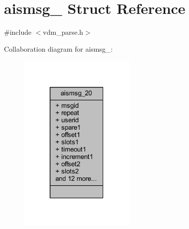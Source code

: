 \hypertarget{structaismsg__20}{}\section{aismsg\+\_ Struct Reference}
\label{structaismsg__20}


{\ttfamily \#include $<$vdm\+\_\+parse.\+h$>$}



Collaboration diagram for aismsg\+\_\+:
\nopagebreak
\begin{figure}[H]
\begin{center}
\leavevmode
\includegraphics[width=160pt]{structaismsg__20__coll__graph}
\end{center}
\end{figure}
